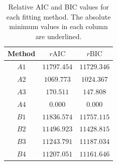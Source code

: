 \begin{table}
  \begin{center}
    \begin{tabular}{ccc}\toprule
      Method & $r\text{AIC}$ & $r\text{BIC}$\\\midrule
      $A1$ & $11797.454$ & $11729.346$\\
       $A2$ & $1069.773$ & $1024.367$\\
       $A3$ & $170.511$ & $147.808$\\
       $A4$ & \underline{$0.000$} & \underline{$0.000$}\\\midrule
      $B1$ & $11836.574$ & $11757.115$\\
       $B2$ & $11496.923$ & $11428.815$\\
       $B3$ & $11243.791$ & $11187.034$\\
       $B4$ & $11207.051$ & $11161.646$\\\bottomrule
    \end{tabular}
    \caption{Relative AIC and BIC values for each fitting method. The absolute minimum values in each column are underlined.}\label{tab:splot-model-results}
  \end{center}
\end{table}

